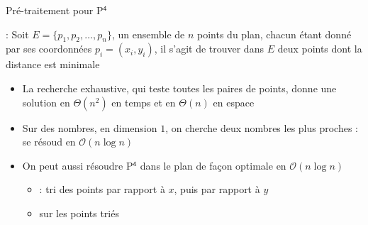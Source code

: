\documentclass[aspectratio=1610,francais,envcountsect]{beamer}
\begin{document}
\begin{frame}[allowframebreaks]{Pré-traitement pour P$^\mathsf{4}$}

   : Soit $E = \{p_1, p_2, \ldots , p_n\}$, un
  ensemble de $n$ points du plan, chacun étant donné par ses
  coordonnées $p_i = (x_i, y_i)$, il s’agit de trouver dans $E$ deux
  points dont la distance est minimale

  \begin{itemize}
  \item La recherche exhaustive, qui teste toutes les paires de
    points, donne une solution en $\Theta(n^2)$ en temps et en
    $\Theta(n)$ en espace
  \item Sur des nombres, en dimension $1$, on cherche deux nombres les
    plus proches : se résoud en $\mathcal{O}(n\log n)$
  \item On peut aussi résoudre P$^\mathsf{4}$ dans le plan de façon
    optimale en $\mathcal{O}(n\log n)$
    \begin{itemize}
    \item {} : tri des points par rapport à
      $x$, puis par rapport à $y$
    \item {} sur les points triés
    \end{itemize}
  \end{itemize}

\end{frame}
\end{document}
